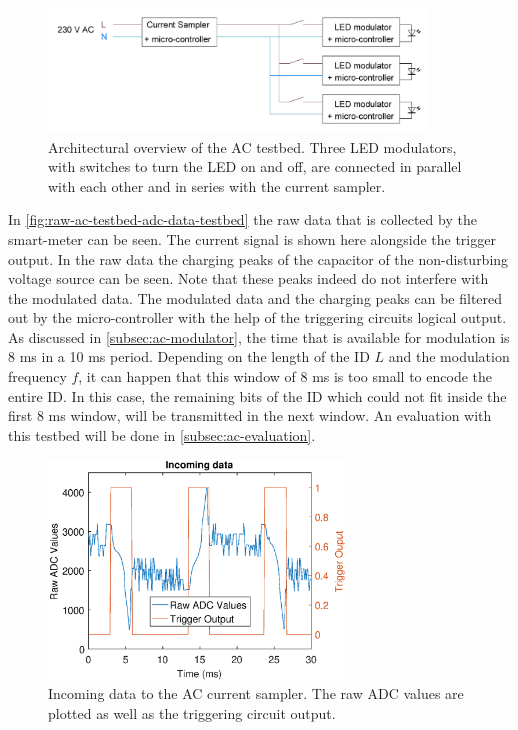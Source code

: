 \begin{figure}[ht]
	\centering
	\includegraphics[angle=0,width=0.9\textwidth,keepaspectratio]{chapters/hardware-chapters/AC/ac-test-bed/ac-test-bed-architectural.JPG}
	\caption{Architectural overview of the AC testbed. Three LED modulators, with switches to turn the LED on and off, are connected in parallel with each other and in series with the current sampler.}
	\label{fig:ac-test-bed-architectural-overview}
\end{figure}



In \autoref{fig:raw-ac-testbed-adc-data-testbed} the raw data that is collected by the smart-meter can be seen.
The current signal is shown here alongside the trigger output.
In the raw data the charging peaks of the capacitor of the non-disturbing voltage source can be seen.
Note that these peaks indeed do not interfere with the modulated data.
The modulated data and the charging peaks can be filtered out by the micro-controller with the help of the triggering circuits logical output.
As discussed in \autoref{subsec:ac-modulator}, the time that is available for modulation is 8 ms in a 10 ms period.
Depending on the length of the ID $L$ and the modulation frequency $f$, it can happen that this window of 8 ms is too small to encode the entire ID.
In this case, the remaining bits of the ID which could not fit inside the first 8 ms window, will be transmitted in the next window.
An evaluation with this testbed will be done in \autoref{subsec:ac-evaluation}.



\begin{figure}[h]
  \centering
  \includegraphics[width=0.7\textwidth]{chapters/evaluation-chapters/hardware/ac/raw-ac-testbed-adc-data.eps}
    \caption{Incoming data to the AC current sampler. The raw ADC values are plotted as well as the triggering circuit output.}
  \label{fig:raw-ac-testbed-adc-data-testbed}
\end{figure}

